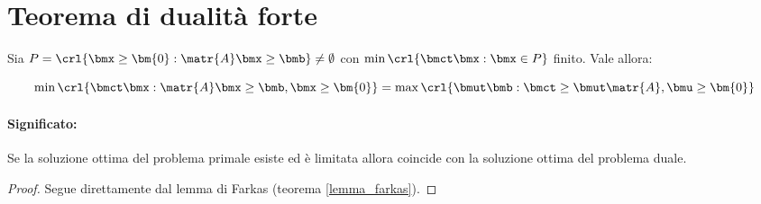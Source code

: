 \documentclass[\main/main.tex]{subfiles}
\begin{document}
\section{Teorema di dualità forte}

\begin{theorem}
  \label{dualita_forte}
  Sia $P=\crl{\bmx\geq\bm{0}: \matr{A}\bmx\geq\bmb} \neq \emptyset$ con $\min\crl{\bmct\bmx: \bmx \in P}$ finito. Vale allora:

  \[
    \min\crl{\bmct\bmx: \matr{A}\bmx \geq \bmb, \bmx \geq \bm{0}} = \max\crl{\bmut\bmb: \bmct \geq \bmut \matr{A}, \bmu \geq \bm{0}}
  \]
  \paragraph*{Significato:} Se la soluzione ottima del problema primale esiste ed è limitata allora coincide con la soluzione ottima del problema duale.
\end{theorem}

\begin{proof}
  Segue direttamente dal lemma di Farkas (teorema \ref{lemma_farkas}).
\end{proof}
\end{document}
